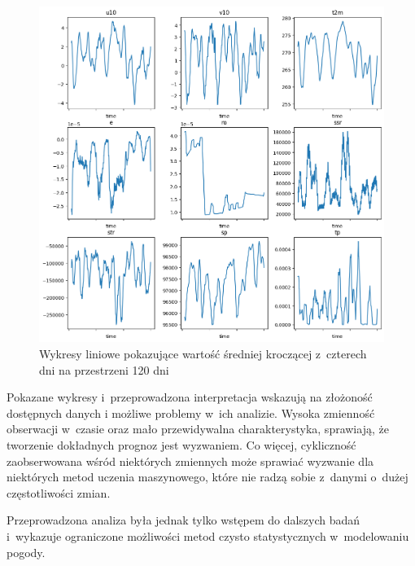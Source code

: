 \begin{figure}[H]
    \centering
    \includegraphics[width=\textwidth]{images/line.png}
    \caption[Wykresy liniowe]{Wykresy liniowe pokazujące wartość średniej kroczącej z~czterech dni na przestrzeni 120 dni}
    \label{line}
\end{figure}

Pokazane wykresy i~przeprowadzona interpretacja wskazują na złożoność dostępnych danych
i możliwe problemy w~ich analizie. Wysoka zmienność obserwacji w~czasie oraz mało przewidywalna
charakterystyka, sprawiają, że tworzenie dokładnych prognoz jest wyzwaniem. Co więcej, 
cykliczność zaobserwowana wśród niektórych zmiennych może sprawiać wyzwanie dla niektórych
metod uczenia maszynowego, które nie radzą sobie z~danymi o~dużej częstotliwości zmian. 

Przeprowadzona analiza była jednak tylko wstępem do dalszych badań i~wykazuje ograniczone
możliwości metod czysto statystycznych w~modelowaniu pogody.

\pagebreak